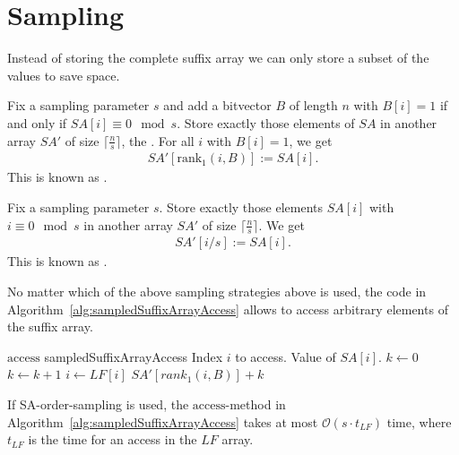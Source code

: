 \section{Sampling}

Instead of storing the complete suffix array we can only store a subset of the values to save space.

\begin{Definition}
  Fix a sampling parameter $s$ and add a bitvector $B$ of length $n$ with $B[i] = 1$ if and only if $SA[i] \equiv 0 \mod s$. Store exactly those elements of $SA$ in another array $SA'$ of size $\lceil \frac{n}{s} \rceil$, the . For all $i$ with $B[i] = 1$, we get
  \begin{align}
    SA'[\mathrm{rank}_1(i, B)] := SA[i]
    \text{.}
  \end{align}
  This is known as .
\end{Definition}

\begin{Definition}
  Fix a sampling parameter $s$. Store exactly those elements $SA[i]$ with $i \equiv 0 \mod s$ in another array $SA'$ of size $\lceil \frac{n}{s} \rceil$. We get
  \begin{align}
    SA'[i/s] := SA[i]
    \text{.}
  \end{align}
  This is known as .
\end{Definition}

No matter which of the above sampling strategies above is used, the code in Algorithm~\ref{alg:sampledSuffixArrayAccess} allows to access arbitrary elements of the suffix array.

\begin{pseudocode}
  {$\mathrm{access}$}
  {sampledSuffixArrayAccess}
  {Index $i$ to access.}
  {Value of $SA[i]$.}
  \STATE $k \gets 0$
    \STATE $k \gets k + 1$
    \STATE $i \gets LF[i]$
  \ENDWHILE
  \RETURN $SA'[rank_1(i, B)] + k$
\end{pseudocode}

\begin{Theorem}
  \label{thm:sampledSuffixArrayAccess}
  If SA-order-sampling is used, the $\mathrm{access}$-method in Algorithm~\ref{alg:sampledSuffixArrayAccess} takes at most $\mathcal{O}(s\cdot t_{LF})$ time, where $t_{LF}$ is the time for an access in the $LF$ array.
\end{Theorem}


